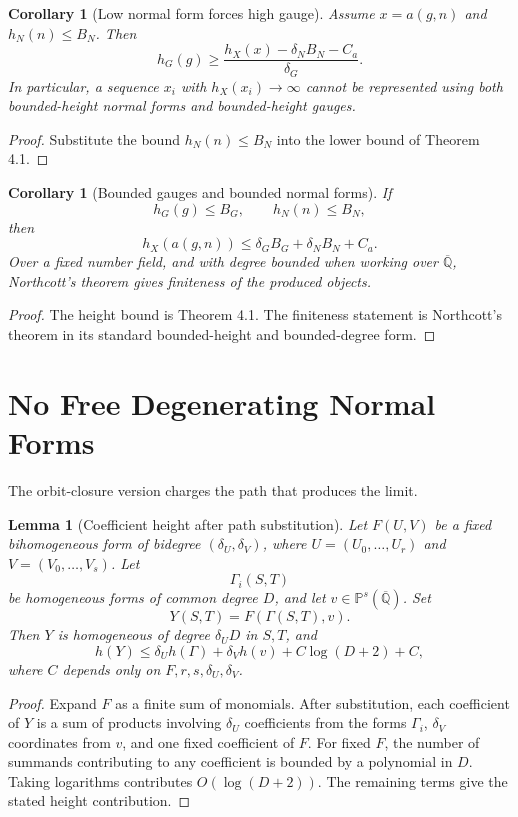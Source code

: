 \documentclass[11pt]{article}
\newtheorem{lemma}[theorem]{Lemma}
\newtheorem{corollary}[theorem]{Corollary}
\begin{document}
\begin{corollary}[Low normal form forces high gauge]
Assume \(x=a(g,n)\) and \(h_N(n)\leq B_N\). Then
\[
h_G(g)
\geq
\frac{h_X(x)-\delta_N B_N-C_a}{\delta_G}.
\]
In particular, a sequence \(x_i\) with \(h_X(x_i)\to\infty\) cannot be represented using both bounded-height normal forms and bounded-height gauges.
\end{corollary}

\begin{proof}
Substitute the bound \(h_N(n)\leq B_N\) into the lower bound of Theorem 4.1.
\end{proof}

\begin{corollary}[Bounded gauges and bounded normal forms]
If
\[
h_G(g)\leq B_G,
\qquad
h_N(n)\leq B_N,
\]
then
\[
h_X(a(g,n))
\leq
\delta_G B_G+\delta_N B_N+C_a.
\]
Over a fixed number field, and with degree bounded when working over \(\overline{\mathbb Q}\), Northcott's theorem gives finiteness of the produced objects.
\end{corollary}

\begin{proof}
The height bound is Theorem 4.1. The finiteness statement is Northcott's theorem in its standard bounded-height and bounded-degree form.
\end{proof}

\section{No Free Degenerating Normal Forms}

The orbit-closure version charges the path that produces the limit.

\begin{lemma}[Coefficient height after path substitution]
Let \(F(U,V)\) be a fixed bihomogeneous form of bidegree \((\delta_U,\delta_V)\), where \(U=(U_0,\ldots,U_r)\) and \(V=(V_0,\ldots,V_s)\). Let
\[
\Gamma_i(S,T)
\]
be homogeneous forms of common degree \(D\), and let \(v\in\mathbb P^s(\overline{\mathbb Q})\). Set
\[
Y(S,T)=F(\Gamma(S,T),v).
\]
Then \(Y\) is homogeneous of degree \(\delta_U D\) in \(S,T\), and
\[
h(Y)
\leq
\delta_U h(\Gamma)+\delta_V h(v)+C\log(D+2)+C,
\]
where \(C\) depends only on \(F,r,s,\delta_U,\delta_V\).
\end{lemma}

\begin{proof}
Expand \(F\) as a finite sum of monomials. After substitution, each coefficient of \(Y\) is a sum of products involving \(\delta_U\) coefficients from the forms \(\Gamma_i\), \(\delta_V\) coordinates from \(v\), and one fixed coefficient of \(F\). For fixed \(F\), the number of summands contributing to any coefficient is bounded by a polynomial in \(D\). Taking logarithms contributes \(O(\log(D+2))\). The remaining terms give the stated height contribution.
\end{proof}
\end{document}
